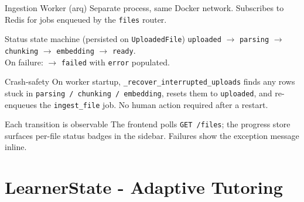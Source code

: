 \documentclass[aspectratio=169, 10pt]{beamer}
\begin{document}
\begin{frame}{Ingestion Worker (arq)}
  \scriptsize
  Separate process, same Docker network. Subscribes to Redis for jobs
  enqueued by the \texttt{files} router.

  \begin{block}{Status state machine (persisted on \texttt{UploadedFile})}
    \scriptsize
    \texttt{uploaded} $\to$ \texttt{parsing} $\to$ \texttt{chunking} $\to$
    \texttt{embedding} $\to$ \texttt{ready}.\\[2pt]
    On failure: $\to$ \texttt{failed} with \texttt{error} populated.
  \end{block}

  \begin{block}{Crash-safety}
    \scriptsize
    On worker startup, \texttt{\_recover\_interrupted\_uploads} finds any
    rows stuck in \texttt{parsing / chunking / embedding}, resets them to
    \texttt{uploaded}, and re-enqueues the \texttt{ingest\_file} job.
    No human action required after a restart.
  \end{block}

  \begin{block}{Each transition is observable}
    \scriptsize
    The frontend polls \texttt{GET /files}; the progress store
    surfaces per-file status badges in the sidebar. Failures show the
    exception message inline.
  \end{block}
\end{frame}

\section{LearnerState - Adaptive Tutoring}
\end{document}

